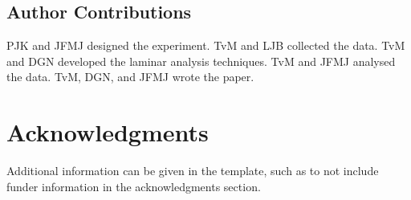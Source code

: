 \documentclass[9pt,lineno]{aperture}
\begin{document}
\subsection{Author Contributions}
PJK and JFMJ designed the experiment. TvM and LJB collected the data. TvM and DGN developed the laminar analysis techniques. TvM and JFMJ analysed the data. TvM, DGN, and JFMJ wrote the paper. 

\section{Acknowledgments}
Additional information can be given in the template, such as to not include funder information in the acknowledgments section.

\nocite{*} %



\end{document}
